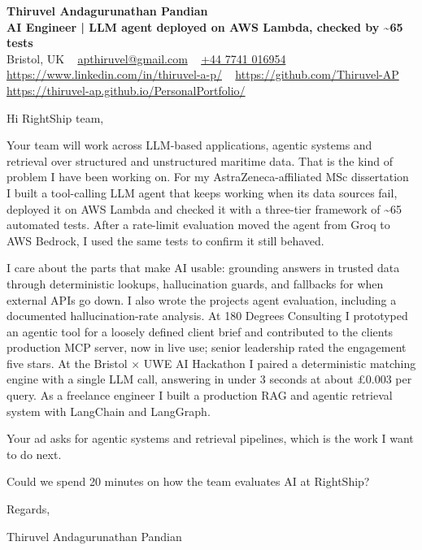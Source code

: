 \documentclass[11pt,a4paper]{article}
\newcommand{\num}[1]{\textbf{#1}}   %
\begin{document}
\raggedright
\pagestyle{empty}

\begin{center}
    {\LARGE \color{linkblue} \textbf{Thiruvel Andagurunathan Pandian}}\\[0.2cm]
    {\color{headernavy}\small\textbf{AI Engineer | LLM agent deployed on AWS Lambda, checked by \num{\textasciitilde{}65} tests}}\\[0.2cm]
    {\small Bristol, UK\nobreak\ \,\textbar\, \href{mailto:apthiruvel@gmail.com}{apthiruvel@gmail.com}\nobreak\ \,\textbar\, \href{tel:+447741016954}{+44 7741 016954}\nobreak\ \,\textbar\, \href{https://www.linkedin.com/in/thiruvel-a-p/}{https://www.linkedin.com/in/thiruvel-a-p/}\nobreak\ \,\textbar\, \href{https://github.com/Thiruvel-AP}{https://github.com/Thiruvel-AP}\nobreak\ \,\textbar\, \href{https://thiruvel-ap.github.io/PersonalPortfolio/}{https://thiruvel-ap.github.io/PersonalPortfolio/}}

\end{center}

\vspace{0.4cm}

\noindent
Hi RightShip team,

Your team will work across LLM-based applications, agentic systems and retrieval over structured and unstructured maritime data. That is the kind of problem I have been working on. For my AstraZeneca-affiliated MSc dissertation I built a tool-calling LLM agent that keeps working when its data sources fail, deployed it on AWS Lambda and checked it with a three-tier framework of \textasciitilde{}65 automated tests. After a rate-limit evaluation moved the agent from Groq to AWS Bedrock, I used the same tests to confirm it still behaved.

I care about the parts that make AI usable: grounding answers in trusted data through deterministic lookups, hallucination guards, and fallbacks for when external APIs go down. I also wrote the project\textquotesingle{}s agent evaluation, including a documented hallucination-rate analysis. At 180 Degrees Consulting I prototyped an agentic tool for a loosely defined client brief and contributed to the client\textquotesingle{}s production MCP server, now in live use; senior leadership rated the engagement five stars. At the Bristol × UWE AI Hackathon I paired a deterministic matching engine with a single LLM call, answering in under 3 seconds at about £0.003 per query. As a freelance engineer I built a production RAG and agentic retrieval system with LangChain and LangGraph.

Your ad asks for agentic systems and retrieval pipelines, which is the work I want to do next.

Could we spend 20 minutes on how the team evaluates AI at RightShip?

\vspace{0.5cm}

Regards,

Thiruvel Andagurunathan Pandian
\end{document}
